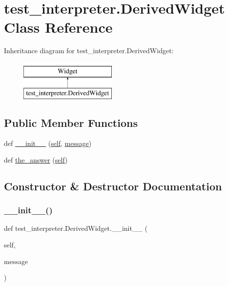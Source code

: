 \hypertarget{classtest__interpreter_1_1_derived_widget}{}\section{test\+\_\+interpreter.\+Derived\+Widget Class Reference}
\label{classtest__interpreter_1_1_derived_widget}
Inheritance diagram for test\+\_\+interpreter.\+Derived\+Widget\+:\begin{figure}[H]
\begin{center}
\leavevmode
\includegraphics[height=2.000000cm]{classtest__interpreter_1_1_derived_widget}
\end{center}
\end{figure}
\subsection*{Public Member Functions}
\begin{DoxyCompactItemize}
\item 
def \mbox{\hyperlink{classtest__interpreter_1_1_derived_widget_a8de8bda77b6d661738117c1af3845e4a}{\+\_\+\+\_\+init\+\_\+\+\_\+}} (\mbox{\hyperlink{modsupport_8h_a0180ca1808366e5da641475e8bf8cca3}{self}}, \mbox{\hyperlink{_s_d_l__opengl__glext_8h_a7b6161cffb9b8aee272b3b916183d28c}{message}})
\item 
def \mbox{\hyperlink{classtest__interpreter_1_1_derived_widget_accd3078b91fa129dcba8ede828fb21e4}{the\+\_\+answer}} (\mbox{\hyperlink{modsupport_8h_a0180ca1808366e5da641475e8bf8cca3}{self}})
\end{DoxyCompactItemize}


\subsection{Constructor \& Destructor Documentation}
\mbox{\label{classtest__interpreter_1_1_derived_widget_a8de8bda77b6d661738117c1af3845e4a}} 
\subsubsection{\texorpdfstring{\_\_init\_\_()}{\_\_init\_\_()}}
{\footnotesize\ttfamily def test\+\_\+interpreter.\+Derived\+Widget.\+\_\+\+\_\+init\+\_\+\+\_\+ (\begin{DoxyParamCaption}\item[{}]{self,  }\item[{}]{message }\end{DoxyParamCaption})}



